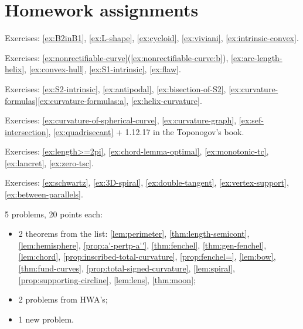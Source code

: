 \chapter{Homework assignments}

Exercises: 
\ref{ex:B2inB1}, 
\ref{ex:L-shape}, 
\ref{ex:cycloid}, 
\ref{ex:viviani}, 
\ref{ex:intrinsic-convex}.

Exercises: 
\ref{ex:nonrectifiable-curve}(\ref{ex:nonrectifiable-curve:b}), 
\ref{ex:arc-length-helix}, 
\ref{ex:convex-hull},  
\ref{ex:S1-intrinsic},  
\ref{ex:flaw}.

Exercises:
\ref{ex:S2-intrinsic},
\ref{ex:antipodal},
\ref{ex:bisection-of-S2}, 
\ref{ex:curvature-formulas}\ref{ex:curvature-formulas:a},    
\ref{ex:helix-curvature}.


Exercises:
\ref{ex:curvature-of-spherical-curve},
\ref{ex:curvature-graph},
\ref{ex:sef-intersection},
\ref{ex:quadrisecant} 
+
1.12.17 in the Toponogov's book.

Exercises:
\ref{ex:length>=2pi},
\ref{ex:chord-lemma-optimal},
\ref{ex:monotonic-tc},
\ref{ex:lancret},
\ref{ex:zero-tsc}.

Exercises:
\ref{ex:schwartz},
\ref{ex:3D-spiral},
\ref{ex:double-tangent},
\ref{ex:vertex-support},
\ref{ex:between-parallels}.

 5 problems, 20 points each:
\begin{itemize}
\item 2 theorems from the list:
\ref{lem:perimeter},
\ref{thm:length-semicont},
\ref{lem:hemisphere},
\ref{prop:a'-pertp-a''},
\ref{thm:fenchel},
\ref{thm:gen-fenchel},
\ref{lem:chord},
\ref{prop:inscribed-total-curvature},
\ref{prop:fenchel=},
\ref{lem:bow},
\ref{thm:fund-curves},
\ref{prop:total-signed-curvature},
\ref{lem:spiral},
\ref{prop:supporting-circline},
\ref{lem:lens},
\ref{thm:moon};
\item 2 problems from HWA's;
\item 1 new problem.
\end{itemize}

